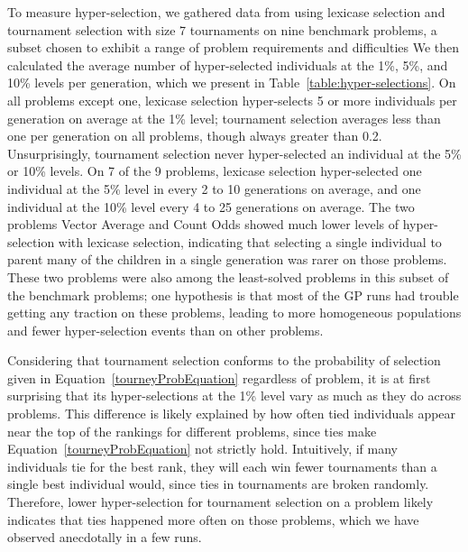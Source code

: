 \documentclass{sig-alternate-05-2015}
\begin{document}
To measure hyper-selection, we gathered data from using lexicase selection and tournament selection with size 7 tournaments on nine benchmark problems, a subset chosen to exhibit a range of problem requirements and difficulties
We then calculated the average number of hyper-selected individuals at the 1\%, 5\%, and 10\% levels per generation, which we present in Table~\ref{table:hyper-selections}. On all problems except one, lexicase selection hyper-selects 5 or more individuals per generation on average at the 1\% level; tournament selection averages less than one per generation on all problems, though always greater than 0.2. Unsurprisingly, tournament selection never hyper-selected an individual at the 5\% or 10\% levels.
On 7 of the 9 problems, lexicase selection hyper-selected one individual at the 5\% level in every 2 to 10 generations on average, and one individual at the 10\% level every 4 to 25 generations on average. The two problems Vector Average and Count Odds showed much lower levels of hyper-selection with lexicase selection, indicating that selecting a single individual to parent many of the children in a single generation was rarer on those problems. These two problems were also among the least-solved problems in this subset of the benchmark problems; one hypothesis is that most of the GP runs had trouble getting any traction on these problems, leading to more homogeneous populations and fewer hyper-selection events than on other problems.

Considering that tournament selection conforms to the probability of selection given in Equation~\ref{tourneyProbEquation} regardless of problem, it is at first surprising that its hyper-selections at the 1\% level vary as much as they do across problems. This difference is likely explained by how often tied individuals appear near the top of the rankings for different problems, since ties make Equation~\ref{tourneyProbEquation} not strictly hold. Intuitively, if many individuals tie for the best rank, they will each win fewer tournaments than a single best individual would, since ties in tournaments are broken randomly. Therefore, lower hyper-selection for tournament selection on a problem likely indicates that ties happened more often on those problems, which we have observed anecdotally in a few runs.
\end{document}
